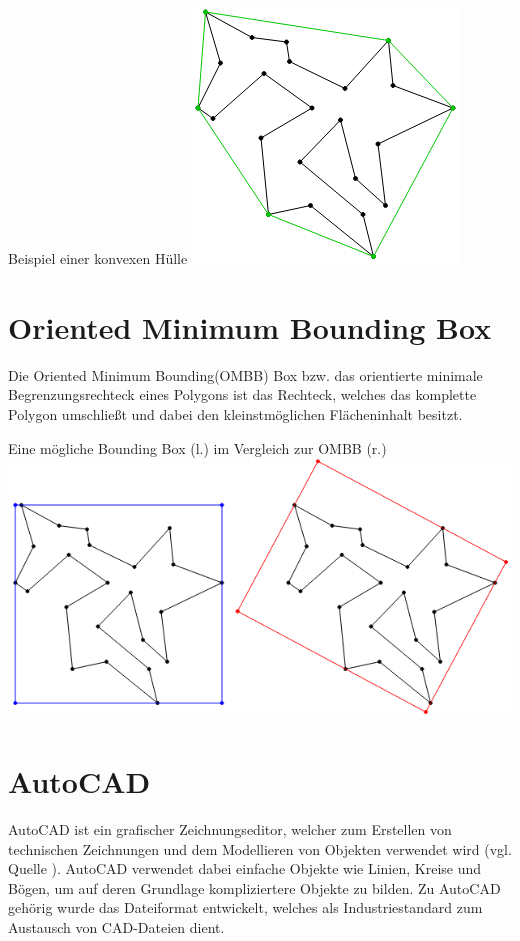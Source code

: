\begin{Bild}{Beispiel einer konvexen Hülle}
	\includegraphics[]{Bilder/convex_hull}
\end{Bild}

\section{Oriented Minimum Bounding Box}
Die Oriented Minimum Bounding(OMBB) Box bzw. das orientierte minimale Begrenzungsrechteck eines Polygons ist das Rechteck, welches das komplette Polygon umschließt und dabei den kleinstmöglichen Flächeninhalt besitzt.

\begin{Bild}{Eine mögliche Bounding Box (l.) im Vergleich zur OMBB (r.)}
	\includegraphics[width = \textwidth]{Bilder/aabb_vs_ombb}
\end{Bild}

\section{AutoCAD}
AutoCAD ist ein grafischer Zeichnungseditor, welcher zum Erstellen von technischen Zeichnungen und dem Modellieren von Objekten verwendet wird (vgl. Quelle \cite{autocadwiki}).
AutoCAD verwendet dabei einfache Objekte wie Linien, Kreise und Bögen, um auf deren Grundlage kompliziertere Objekte zu bilden.
Zu AutoCAD gehörig wurde das Dateiformat  entwickelt, welches als Industriestandard zum Austausch von CAD-Dateien dient. \\

